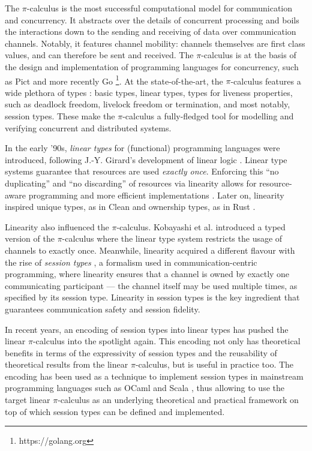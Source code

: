 \documentclass[sigplan,10pt,anonymous,review]{acmart}
\theoremstyle{definition}
\newcommand{\picalc}{$\pi$-calculus}
\begin{document}
The \picalc{} \cite{MilnerPW92,Milner99} is the most successful computational model for communication and concurrency.
It abstracts over the details of concurrent processing and boils the interactions down to the sending and receiving of data over communication channels.
Notably, it features channel mobility: channels themselves are first class values, and can therefore be sent and received.
The \picalc{} is at the basis of the design and implementation of programming languages for concurrency, such as Pict \cite{PierceT00} and more recently Go \footnote{https://golang.org}.
At the state-of-the-art, the \picalc{} features a wide plethora of types \cite{K07}: basic types, linear types, types for liveness properties, such as deadlock freedom, livelock freedom or termination, and most notably, session types.
These make the \picalc{} a fully-fledged tool for modelling and verifying concurrent and distributed systems.

In the early '90s, \emph{linear types} for (functional) programming languages \cite{Wadler90,Bernardy2018} were introduced, following J.-Y. Girard's development of linear logic \cite{Girard87}.
Linear type systems guarantee that resources are used \emph{exactly once}.
Enforcing this ``no duplicating'' and ``no discarding'' of resources via linearity allows for resource-aware programming and more efficient implementations \cite{Wadler90}.
Later on, linearity inspired unique types, as in Clean \cite{BarendsenS96} and ownership types, as in Rust \cite{MatsakisK14}.

Linearity also influenced the $\pi$-calculus.
Kobayashi et al. \cite{KPT96} introduced a typed version of the \picalc{} where the linear type system restricts the usage of channels to exactly once.
%
Meanwhile, linearity acquired a different flavour with the rise of \emph{session types} \cite{H93,THK94,HVK98}, a formalism used in communication-centric programming, where linearity ensures that a channel is owned by exactly one communicating participant --- the channel itself may be used multiple times, as specified by its session type.
Linearity in session types is the key ingredient that guarantees communication safety and session fidelity.

In recent years, an encoding of session types into linear types \cite{DardhaGS12,Dardha14,DardhaGS17} has pushed the linear \picalc{} \cite{KPT96} into the spotlight again.
This encoding not only has theoretical benefits in terms of the expressivity of session types and the reusability of theoretical results from the linear \picalc{}, but is useful in practice too.
The encoding has been used as a technique to implement session types in mainstream programming languages such as OCaml \cite{Padovani17} and Scala \cite{ScalasY16,ScalasDHY17}, thus allowing to use the target linear \picalc{} as an underlying theoretical and practical framework on top of which session types can be defined and implemented.
\end{document}
